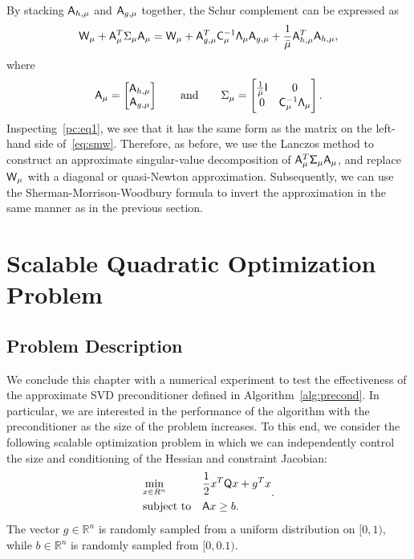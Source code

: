 By stacking $ \mathsf{A}_{h,\mu} $ and $\mathsf{A}_{g,\mu}$ together, 
the Schur complement can be expressed as
\begin{equation}\label{pc:eq1}
\mathsf{W}_\mu  +  \mathsf{A}_\mu ^T \Sigma_{\mu} \mathsf{A}_\mu = 
\mathsf{W}_\mu +  \mathsf{A}_{g,\mu}^T  \mathsf{C}_\mu^{-1} \mathsf{\Lambda}_\mu  \mathsf{A}_{g,\mu}  
+ \frac{1}{\bar{\mu}}  \mathsf{A}_{h,\mu}^T \mathsf{A}_{h,\mu}, 
\end{equation}
where 
\begin{equation}\label{pc:eq2}
 \mathsf{A}_\mu = 
 \begin{bmatrix}
 \mathsf{A}_{h,\mu} \\
 \mathsf{A}_{g,\mu}
 \end{bmatrix} \qquad\text{and}\qquad
  \Sigma_{\mu} = 
  \begin{bmatrix}  
  \frac{1}{\bar{\mu}} \mathsf{I}  & 0 \\
  0   &  \mathsf{C}_\mu^{-1} \mathsf{\Lambda}_\mu 
  \end{bmatrix}.
\end{equation}
Inspecting~\eqref{pc:eq1}, we see that it has the same form as the matrix on the left-hand side of~\eqref{eq:smw}.  Therefore, as before, we use the Lanczos method to construct an approximate singular-value decomposition of $\mathsf{A}_\mu^T \mathsf{\Sigma}_\mu \mathsf{A}_\mu$, and replace $\mathsf{W}_{\mu}$ with a diagonal or quasi-Newton approximation.  Subsequently, we can use the Sherman-Morrison-Woodbury formula to invert the approximation in the same manner as in the previous section. 

\section{Scalable Quadratic Optimization Problem}
\subsection{Problem Description}
We conclude this chapter with a numerical experiment to test the effectiveness of the approximate SVD
preconditioner defined in Algorithm~\ref{alg:precond}.  In particular, we are
interested in the performance of the algorithm with the preconditioner as the size of the problem increases.  
To this end, we consider the following scalable optimization problem
in which we can independently control the size and conditioning of the Hessian
and constraint Jacobian:
\begin{equation}\label{eq:quadra}
  \begin{aligned}
    &\underset{x \in R^n} {\text{min}}  
    & & \frac{1}{2}x^T \mathsf{Q} x + g^T x \\
    &\text{subject to} & & \mathsf{A}x \geq b.  \\
  \end{aligned}.
\end{equation}
The vector $g\in \mathbb{R}^{n}$ is randomly sampled from a uniform distribution 
on $[ 0,1)$, while $b \in \mathbb{R}^{n}$ is randomly sampled from $[0,0.1)$. 


